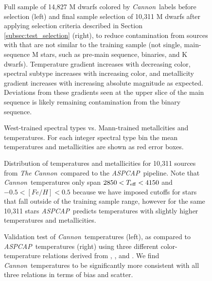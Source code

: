 \documentclass[modern]{aastex62}
\newcommand{\thecannon}{\textsl{The Cannon}}
\newcommand{\cannon}{\textsl{Cannon}}
\newcommand{\aspcap}{\textsl{ASPCAP}}
\begin{document}
\begin{figure}[ht]
\caption{Full sample of 14,827 M dwarfs colored by \cannon\ labels before selection (left) and final sample selection of 10,311 M dwarfs after applying selection criteria described in Section \ref{subsec:test_selection} (right), to reduce contamination from sources with that are not similar to the training sample (not single, main-sequence M stars, such as pre-main sequence, binaries, and K dwarfs). Temperature gradient increases with decreasing color, spectral subtype increases with increasing color, and metallicity gradient increases with increasing absolute magnitude as expected. Deviations from these gradients seen at the upper slice of the main sequence is likely remaining contamination from the binary sequence. \label{fig:safe_selection}}
\end{figure}

\begin{figure}[ht]
\caption{West-trained spectral types vs. Mann-trained metallcities and temperatures. For each integer spectral type bin the mean temperatures and metallicities are shown as red error boxes. \label{fig:west_vs_mann}}
\end{figure}

\begin{figure}[ht]
\caption{Distribution of temperatures and metallicities for 10,311 sources from \thecannon\ compared to the \aspcap\ pipeline. Note that \cannon\ temperatures only span $2850<T_{\rm eff}<4150$ and $-0.5<[Fe/H]<0.5$ because we have imposed cutoffs for stars that fall outside of the training sample range, however for the same 10,311 stars \aspcap\ predicts temperatures with slightly higher temperatures and metallicities. \label{fig:aspcap_cannon_label_hist}}
\end{figure}

\begin{figure}[ht]
\caption{Validation test of \cannon\ temperatures (left), as compared to \aspcap\ temperatures (right) using three different color-temperature relations derived from \citealt{Mann:2015}, \citealt{Casagrande:2008}, and \citealt{Boyajian:2013}. We find \cannon\ temperatures to be significantly more consistent with all three relations in terms of bias and scatter. \label{fig:aspcap_cannon_validation}}
\end{figure}
\end{document}
